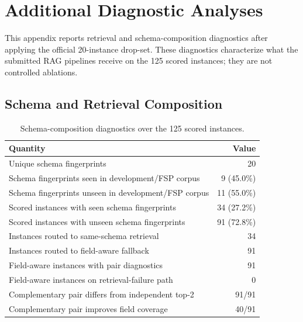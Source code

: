 \section{Additional Diagnostic Analyses}
\label{sec:appendix-retrieval-diagnostics}

This appendix reports retrieval and schema-composition diagnostics after applying the official 20-instance drop-set. These diagnostics characterize what the submitted RAG pipelines receive on the 125 scored instances; they are not controlled ablations.

\begingroup
\setlength{\floatsep}{3pt plus 1pt minus 1pt}
\setlength{\textfloatsep}{4pt plus 1pt minus 1pt}
\setlength{\intextsep}{3pt plus 1pt minus 1pt}
\setlength{\abovecaptionskip}{2pt}
\setlength{\belowcaptionskip}{1pt}
\renewcommand{\arraystretch}{0.96}

\subsection{Schema and Retrieval Composition}

\begin{table}[!htbp]
\centering
\caption{Schema-composition diagnostics over the 125 scored instances.}
\label{tab:retrieval-diagnostics}
\scriptsize
\begin{tabularx}{\linewidth}{@{}>{\raggedright\arraybackslash}Xr@{}}
\toprule
Quantity & Value \\
\midrule
Unique schema fingerprints & 20 \\
Schema fingerprints seen in development/FSP corpus & 9 (45.0\%) \\
Schema fingerprints unseen in development/FSP corpus & 11 (55.0\%) \\
Scored instances with seen schema fingerprints & 34 (27.2\%) \\
Scored instances with unseen schema fingerprints & 91 (72.8\%) \\
Instances routed to same-schema retrieval & 34 \\
Instances routed to field-aware fallback & 91 \\
Field-aware instances with pair diagnostics & 91 \\
Field-aware instances on retrieval-failure path & 0 \\
Complementary pair differs from independent top-2 & 91/91 \\
Complementary pair improves field coverage & 40/91 \\
\bottomrule
\end{tabularx}
\end{table}

